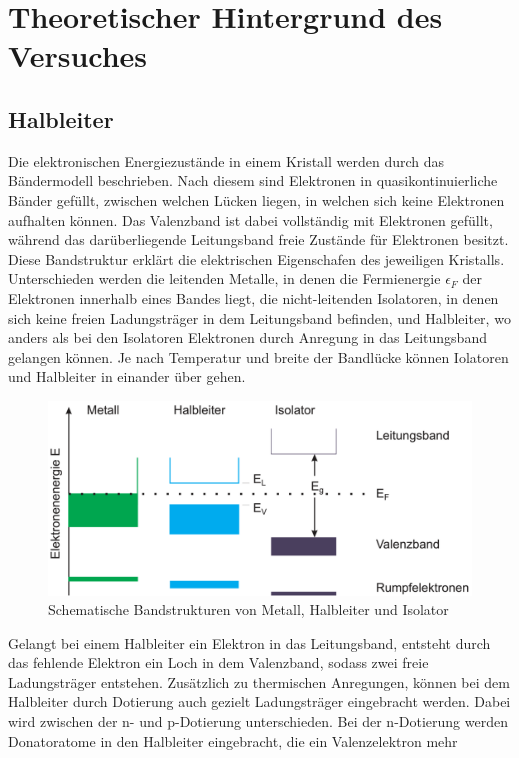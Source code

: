 \section{Theoretischer Hintergrund des Versuches}
\label{sec:Theorie}
\subsection{Halbleiter}
\label{sec:Halbleiter}
Die elektronischen Energiezustände in einem Kristall werden durch das Bändermodell beschrieben. Nach diesem sind Elektronen in quasikontinuierliche
Bänder gefüllt, zwischen welchen Lücken liegen, in welchen sich keine Elektronen aufhalten können. Das Valenzband ist dabei vollständig mit Elektronen
gefüllt, während das darüberliegende Leitungsband freie Zustände für Elektronen besitzt. Diese Bandstruktur erklärt die elektrischen Eigenschafen
des jeweiligen Kristalls. Unterschieden werden die leitenden Metalle, in denen die Fermienergie $\epsilon_F$ der Elektronen innerhalb eines Bandes liegt,
die nicht-leitenden Isolatoren, in denen sich keine freien Ladungsträger in dem Leitungsband befinden, und Halbleiter, wo anders als bei den Isolatoren
Elektronen durch Anregung in das Leitungsband gelangen können. Je nach Temperatur und breite der Bandlücke können Iolatoren und Halbleiter in einander 
über gehen. 
\begin{figure}[H]
    \centering
    \includegraphics[scale=0.4]{pictures/Bandstrukturen.png}
    \caption{Schematische Bandstrukturen von Metall, Halbleiter und Isolator}
\end{figure}
\noindent
Gelangt bei einem Halbleiter ein Elektron in das Leitungsband, entsteht durch das fehlende Elektron ein Loch in dem Valenzband, sodass zwei freie 
Ladungsträger entstehen. Zusätzlich zu thermischen Anregungen, können bei dem Halbleiter durch Dotierung auch gezielt Ladungsträger eingebracht werden.
Dabei wird zwischen der n- und p-Dotierung unterschieden. Bei der n-Dotierung werden Donatoratome in den Halbleiter eingebracht, die ein Valenzelektron mehr
